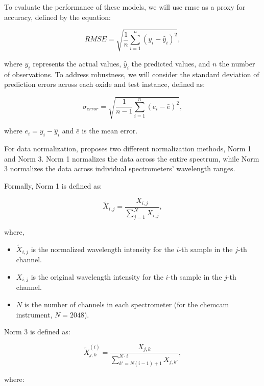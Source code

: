 To evaluate the performance of these models, we will use \gls{rmse} as a proxy for accuracy, defined by the equation:

\begin{equation}
    RMSE = \sqrt{\frac{1}{n} \sum_{i=1}^{n} (y_i - \hat{y}_i)^2},
\end{equation}

where $y_i$ represents the actual values, $\hat{y}_i$ the predicted values, and $n$ the number of observations.
To address robustness, we will consider the standard deviation of prediction errors across each oxide and test instance, defined as:

\begin{equation}
    \sigma_{error} = \sqrt{\frac{1}{n-1} \sum_{i=1}^{n} (e_i - \bar{e})^2},
\end{equation}

where $e_i = y_i - \hat{y}_i$ and $\bar{e}$ is the mean error.

For data normalization, \citet{cleggRecalibrationMarsScience2017} proposes two different normalization methods, Norm 1 and Norm 3.
Norm 1 normalizes the data across the entire spectrum, while Norm 3 normalizes the data across individual spectrometers' wavelength ranges.

Formally, Norm 1 is defined as:

\begin{equation}
    \tilde{X}_{i,j} = \frac{X_{i,j}}{\sum_{j=1}^{N} X_{i,j}},
\end{equation}

where,

\begin{itemize}
    \item $\tilde{X}_{i,j}$ is the normalized wavelength intensity for the $i$-th sample in the $j$-th channel.
    \item $X_{i,j}$ is the original wavelength intensity for the $i$-th sample in the $j$-th channel.
    \item $N$ is the number of channels in each spectrometer (for the \gls{chemcam} instrument, $N = 2048$).
\end{itemize}

Norm 3 is defined as:

\begin{equation}
    \tilde{X}_{j,k}^{(i)} = \frac{X_{j,k}}{\sum_{k'=N(i-1)+1}^{N \cdot i} X_{j,k'}},
\end{equation}

where:

